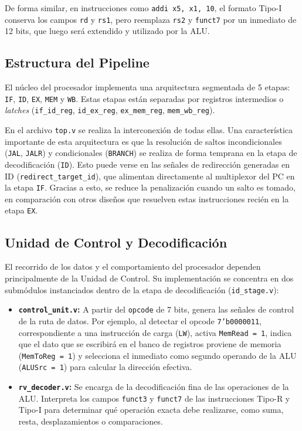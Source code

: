 De forma similar, en instrucciones como \texttt{addi x5, x1, 10}, el formato Tipo-I conserva los campos \texttt{rd} y \texttt{rs1}, pero reemplaza \texttt{rs2} y \texttt{funct7} por un inmediato de 12 bits, que luego será extendido y utilizado por la ALU.

\subsection{Estructura del Pipeline}
El núcleo del procesador implementa una arquitectura segmentada de 5 etapas: \texttt{IF}, \texttt{ID}, \texttt{EX}, \texttt{MEM} y \texttt{WB}. Estas etapas están separadas por registros intermedios o \textit{latches} (\texttt{if\_id\_reg}, \texttt{id\_ex\_reg}, \texttt{ex\_mem\_reg}, \texttt{mem\_wb\_reg}).

En el archivo \texttt{top.v} se realiza la interconexión de todas ellas. Una característica importante de esta arquitectura es que la resolución de saltos incondicionales (\texttt{JAL}, \texttt{JALR}) y condicionales (\texttt{BRANCH}) se realiza de forma temprana en la etapa de decodificación (\texttt{ID}). Esto puede verse en las señales de redirección generadas en ID (\texttt{redirect\_target\_id}), que alimentan directamente al multiplexor del PC en la etapa \texttt{IF}. Gracias a esto, se reduce la penalización cuando un salto es tomado, en comparación con otros diseños que resuelven estas instrucciones recién en la etapa \texttt{EX}.

\subsection{Unidad de Control y Decodificación}
El recorrido de los datos y el comportamiento del procesador dependen principalmente de la Unidad de Control. Su implementación se concentra en dos submódulos instanciados dentro de la etapa de decodificación (\texttt{id\_stage.v}):

\begin{itemize}
    \item \textbf{\texttt{control\_unit.v}:} A partir del \texttt{opcode} de 7 bits, genera las señales de control de la ruta de datos. Por ejemplo, al detectar el opcode \texttt{7'b0000011}, correspondiente a una instrucción de carga (\texttt{LW}), activa \texttt{MemRead = 1}, indica que el dato que se escribirá en el banco de registros proviene de memoria (\texttt{MemToReg = 1}) y selecciona el inmediato como segundo operando de la ALU (\texttt{ALUSrc = 1}) para calcular la dirección efectiva.
    
    \item \textbf{\texttt{rv\_decoder.v}:} Se encarga de la decodificación fina de las operaciones de la ALU. Interpreta los campos \texttt{funct3} y \texttt{funct7} de las instrucciones Tipo-R y Tipo-I para determinar qué operación exacta debe realizarse, como suma, resta, desplazamientos o comparaciones.
\end{itemize}


